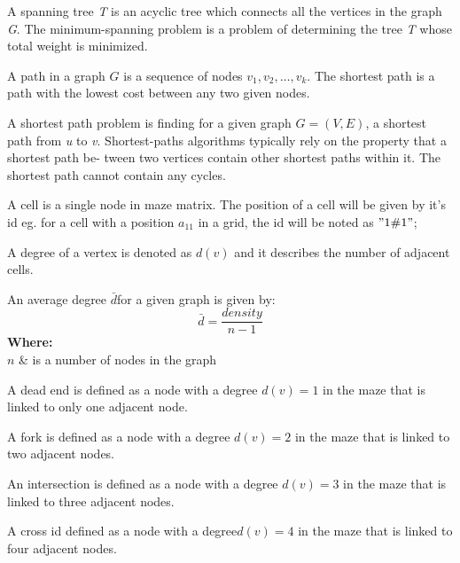 \begin{definition}
A spanning tree \textit{T} is an acyclic tree which connects all the vertices in the graph \textit{G}. The minimum-spanning problem is a problem of determining the tree \textit{T} whose total weight is minimized.
\end{definition}
\begin{definition}
A path in a graph $G$ is a sequence of nodes $v_1, v_2,\ldots,v_k$. The shortest path is a path with the lowest cost between any two given nodes.
\end{definition}
\begin{definition}
A shortest path problem is finding for a given graph $G = (V,E)$, a shortest path from \textit{u} to \textit{v}. Shortest-paths algorithms typically rely on the property that a shortest path be- tween two vertices contain other shortest paths within it.
The shortest path cannot contain any cycles.\cite{introduction }
\end{definition}
\begin{definition}
A cell is a single node in maze matrix. The position of a cell will be given by it's id eg. for a cell with a position $a_{11}$ in a grid, the id will be noted as $"1\char"0023 1"$;	
\end{definition}
\begin{definition}
A degree of a vertex is denoted as $d(v)$ and it describes the number of adjacent cells.\cite{ReHofs}
\end{definition}
\begin{definition}
	An average degree $\bar{d}$for a given graph is given by\cite{ReHofs}:
	\begin{equation}
	\bar{d} = \frac{density}{n-1}	
	\end{equation}
	\textbf{Where:}\\
$n$ & is a number of nodes in the graph\\	
	\end{definition}
\begin{definition}
A dead end is defined as a node with a degree $d(v) = 1$ in the maze that is linked to only one adjacent node.
\end{definition}
\begin{definition}
A fork is defined as a node with a degree $d(v) = 2$ in the maze that is linked to two adjacent nodes.
\end{definition}
\begin{definition}
An intersection is defined as a node with a degree $d(v) = 3$ in the maze that is linked to three adjacent nodes.
\end{definition}
\begin{definition}
A cross id defined as a node with a degree$d(v) = 4$ in the maze that is linked to four adjacent nodes. 	
\end{definition}

